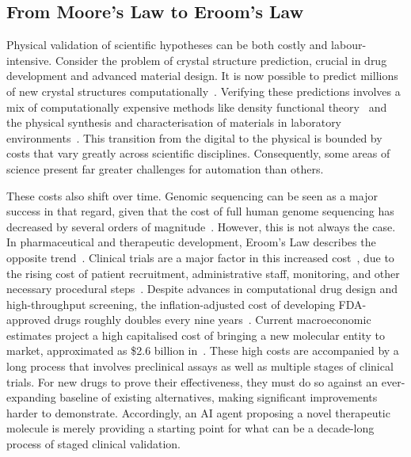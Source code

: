 \documentclass[11pt, a4paper, twocolumn, goog]{google}
\begin{document}
\subsection{From Moore’s Law to Eroom’s Law}

Physical validation of scientific hypotheses can be both costly and labour-intensive. Consider the problem of crystal structure prediction, crucial in drug development and advanced material design. It is now possible to predict millions of new crystal structures computationally~\citep{merchant2023scaling}. Verifying these predictions involves a mix of computationally expensive methods like density functional theory~\citep{woodley2008crystal, oganov2019structure} and the physical synthesis and characterisation of materials in laboratory environments~\citep{price2014predicting}. This transition from the digital to the physical is bounded by costs that vary greatly across scientific disciplines. Consequently, some areas of science present far greater challenges for automation than others.

These costs also shift over time. Genomic sequencing can be seen as a major success in that regard, given that the cost of full human genome sequencing has decreased by several orders of magnitude~\citep{shendure2017dna}. However, this is not always the case. In pharmaceutical and therapeutic development, Eroom’s Law describes the opposite trend~\citep{scannell2012diagnosing, ringel2020breaking}. Clinical trials are a major factor in this increased cost~\citep{dimasi2016innovation, wouters2020estimated}, due to the rising cost of patient recruitment, administrative staff, monitoring, and other necessary procedural steps~\citep{sertkaya2016key}. Despite advances in computational drug design and high-throughput screening, the inflation-adjusted cost of developing FDA-approved drugs roughly doubles every nine years~\citep{scannell2012diagnosing}. Current macroeconomic estimates project a high capitalised cost of bringing a new molecular entity to market, approximated as \$2.6 billion in~\citep{dimasi2016innovation}. These high costs are accompanied by a long process that involves preclinical assays as well as multiple stages of clinical trials. For new drugs to prove their effectiveness, they must do so against an ever-expanding baseline of existing alternatives, making significant improvements harder to demonstrate. Accordingly, an AI agent proposing a novel therapeutic molecule is merely providing a starting point for what can be a decade-long process of staged clinical validation.
\end{document}
